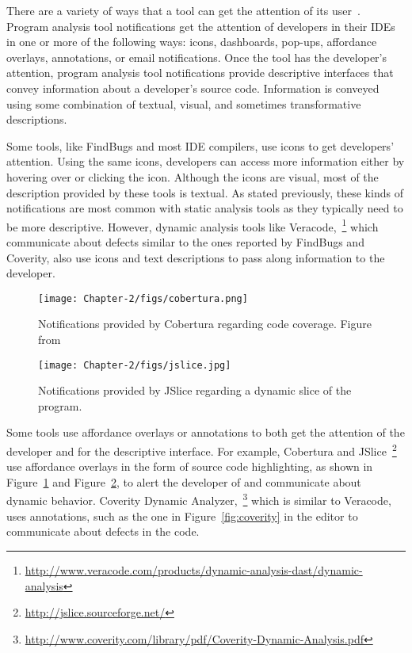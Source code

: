 There are a variety of ways that a tool can get the attention of its user~\cite{robillard2014recommendation}. Program analysis tool notifications get the attention of developers in their IDEs in one or more of the following ways: icons, dashboards, pop-ups, affordance overlays, annotations, or email notifications.
Once the tool has the developer's attention, program analysis tool notifications provide descriptive interfaces that convey information about a developer's source code. 
Information is conveyed using some combination of textual, visual, and sometimes transformative descriptions.

Some tools, like FindBugs and most IDE compilers, use icons to get developers' attention. Using the same icons, developers can access more information either by hovering over or clicking the icon. Although the icons are visual, most of the description provided by these tools is textual. As stated previously, these kinds of notifications are most common with static analysis tools as they typically need to be more descriptive. However, dynamic analysis tools like Veracode,~\footnote{\url{http://www.veracode.com/products/dynamic-analysis-dast/dynamic-analysis}} which communicate about defects similar to the ones reported by FindBugs and Coverity, also use icons and text descriptions to pass along information to the developer.

\begin{figure}
	\centering
	\texttt{[image: Chapter-2/figs/cobertura.png]}
	\caption{Notifications provided by Cobertura regarding code coverage. Figure from}
	\label{fig:cobertura}
\end{figure}

\begin{figure}
	\centering
	\texttt{[image: Chapter-2/figs/jslice.jpg]}
	\caption{Notifications provided by JSlice regarding a dynamic slice of the program.}
	\label{fig:jslice}
\end{figure}


Some tools use affordance overlays or annotations to both get the attention of the developer and for the descriptive interface. For example, Cobertura and JSlice~\footnote{\url{http://jslice.sourceforge.net/}} use affordance overlays in the form of source code highlighting, as shown in Figure~\ref{fig:cobertura} and Figure~\ref{fig:jslice}, to alert the developer of and communicate about dynamic behavior. Coverity Dynamic Analyzer,~\footnote{\url{http://www.coverity.com/library/pdf/Coverity-Dynamic-Analysis.pdf}} which is similar to Veracode, uses annotations, such as the one in Figure~\ref{fig:coverity} in the editor to communicate about defects in the code.

